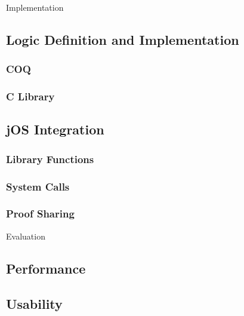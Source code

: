 \documentclass[10pt]{article}
\begin{document}
\begin{section}{Implementation}

\subsection{Logic Definition and Implementation}
\subsubsection{COQ}
\subsubsection{C Library}
\subsection{jOS Integration}
\subsubsection{Library Functions}
\subsubsection{System Calls}
\subsubsection{Proof Sharing}

\end{section}

\begin{section}{Evaluation}
\subsection{Performance}
\subsection{Usability}
\end{section}
\end{document}
